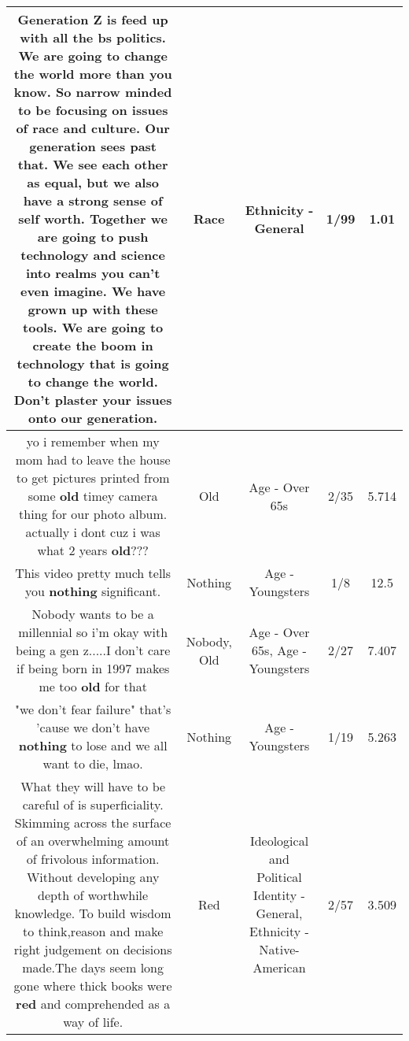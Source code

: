 \documentclass[11pt]{article}
\newlength\mylength
\begin{document}
\begin{center}
\begin{longtable}{|C{.65\mylength}|C{.30\mylength}|C{.12\mylength}|C{.12\mylength}|C{.12\mylength}|}
  \small Generation Z is feed up with all the bs politics. We are going to change the world more than you know. So narrow minded to be focusing on issues of \textbf{race} and culture. Our generation sees past that. We see each other as equal, but we also have a strong sense of self worth. Together we are going to push technology and science into realms you can't even imagine. We have grown up with these tools. We are going to create the boom in technology that is going to change the world. Don't plaster your issues onto our generation.\normalsize   & Race & Ethnicity - General & 1/99 & 1.01 \\  \hline
  \small yo i remember when my mom had to leave the house to get pictures printed from some \textbf{old} timey camera thing for our photo album. actually i dont cuz i was what 2 years \textbf{old}???\normalsize   & Old & Age - Over 65s & 2/35 & 5.714 \\  \hline
  \small This video pretty much tells you \textbf{nothing} significant.\normalsize   & Nothing & Age - Youngsters & 1/8 & 12.5 \\  \hline
  \small Nobody wants to be a millennial so i'm okay with being a gen z.....I don't care if being born in 1997 makes me too \textbf{old} for that\normalsize   & Nobody, Old & Age - Over 65s, Age - Youngsters & 2/27 & 7.407 \\  \hline
  \small "we don't fear failure" that's 'cause we don't have \textbf{nothing} to lose and we all want to die, lmao.\normalsize   & Nothing & Age - Youngsters & 1/19 & 5.263 \\  \hline
  \small What they will have to be careful of is superficiality. Skimming across the surface of an overwhelming amount of frivolous information. Without developing any depth of worthwhile  knowledge. To build wisdom to think,reason and make right judgement on decisions made.The days seem long gone where thick books were \textbf{r\textbf{ed}} and comprehended  as a way of life.\normalsize   & Red &  Ideological and Political Identity - General, Ethnicity - Native-American & 2/57 & 3.509 \\  \hline

\end{longtable}
\end{center}
\end{document}
